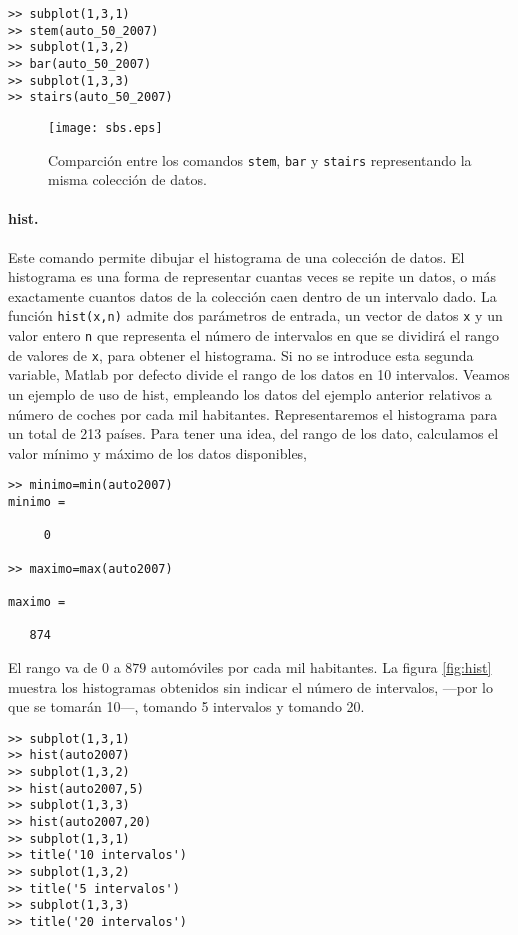 \begin{verbatim}
>> subplot(1,3,1)
>> stem(auto_50_2007)
>> subplot(1,3,2)
>> bar(auto_50_2007)
>> subplot(1,3,3)
>> stairs(auto_50_2007)
\end{verbatim}

\begin{figure}[h]
\centering
\texttt{[image: sbs.eps]}
\caption{Comparción entre los comandos \texttt{stem}, \texttt{bar} y \texttt{stairs} representando la misma colección de datos.}
\label{fig:sbs}
\end{figure}

\paragraph{hist.} Este comando permite dibujar el histograma de una colección de datos. El histograma es una forma de representar cuantas veces se repite un datos, o más exactamente cuantos datos de la colección caen dentro de un intervalo dado. La función \texttt{hist(x,n)} admite dos parámetros de entrada, un vector de datos \texttt{x} y un valor entero \texttt{n} que representa el número de intervalos en que se dividirá el rango de valores de \texttt{x}, para obtener el histograma. Si no se introduce esta segunda variable, Matlab por defecto divide el rango de los datos en 10 intervalos. Veamos un ejemplo de uso de hist, empleando los datos del ejemplo anterior relativos a número de coches por cada mil habitantes. Representaremos el histograma para un total de 213 países. Para tener una idea, del rango de los dato, calculamos el valor mínimo y máximo de los datos disponibles,
\begin{verbatim}
>> minimo=min(auto2007)
minimo =

     0

>> maximo=max(auto2007)

maximo =

   874
\end{verbatim}

El rango va de $0$ a $879$ automóviles por cada mil habitantes. La figura \ref{fig:hist} muestra los histogramas obtenidos sin indicar el número de intervalos, ---por lo que se tomarán 10---, tomando 5 intervalos y tomando 20.

\begin{verbatim}
>> subplot(1,3,1)
>> hist(auto2007)
>> subplot(1,3,2)
>> hist(auto2007,5)
>> subplot(1,3,3)
>> hist(auto2007,20)
>> subplot(1,3,1)
>> title('10 intervalos')
>> subplot(1,3,2)
>> title('5 intervalos')
>> subplot(1,3,3)
>> title('20 intervalos')
\end{verbatim}


